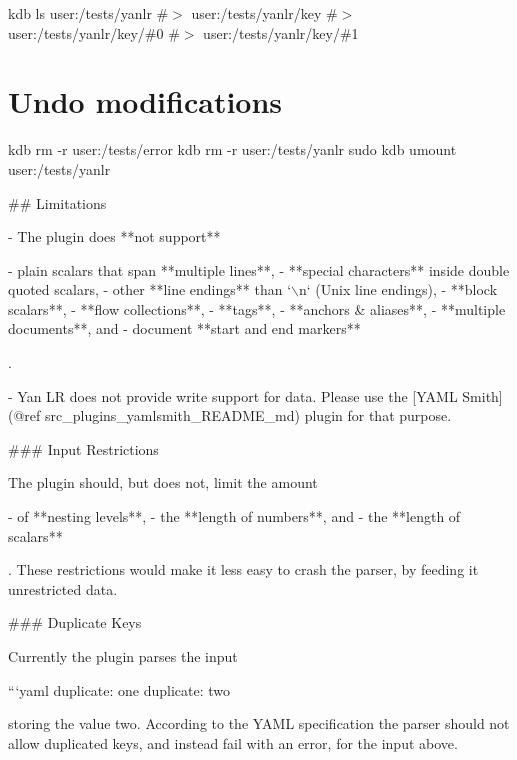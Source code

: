 kdb ls user\+:/tests/yanlr \#$>$ user\+:/tests/yanlr/key \#$>$ user\+:/tests/yanlr/key/\#0 \#$>$ user\+:/tests/yanlr/key/\#1\hypertarget{autotoc_md897_autotoc_md936}{}\section{Undo modifications}\label{autotoc_md897_autotoc_md936}
kdb rm -\/r user\+:/tests/error kdb rm -\/r user\+:/tests/yanlr sudo kdb umount user\+:/tests/yanlr 
\begin{DoxyCode}
## Limitations

- The plugin does **not support**

  - plain scalars that span **multiple lines**,
  - **special characters** inside double quoted scalars,
  - other **line endings** than `\(\backslash\)n` (Unix line endings),
  - **block scalars**,
  - **flow collections**,
  - **tags**,
  - **anchors & aliases**,
  - **multiple documents**, and
  - document **start and end markers**

  .

- Yan LR does not provide write support for data. Please use the [YAML Smith](@ref
       src\_plugins\_yamlsmith\_README\_md) plugin for that purpose.

### Input Restrictions

The plugin should, but does not, limit the amount

- of **nesting levels**,
- the **length of numbers**, and
- the **length of scalars**

. These restrictions would make it less easy to crash the parser, by feeding it unrestricted data.

### Duplicate Keys

Currently the plugin parses the input

```yaml
duplicate: one
duplicate: two
\end{DoxyCode}


storing the value {\ttfamily two}. According to the Y\+A\+ML specification the parser should not allow duplicated keys, and instead fail with an error, for the input above.